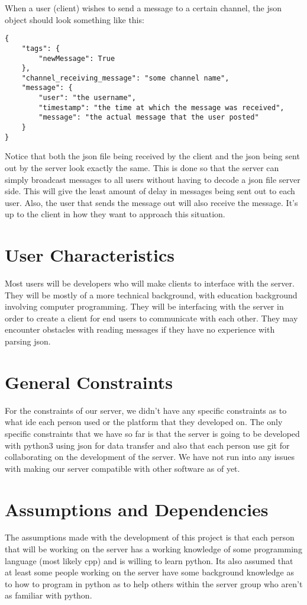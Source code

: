 When a user (client) wishes to send a message to a certain channel, the \gls{json} object should look something like this:

\begin{lstlisting}[style=json]
{
    "tags": {
        "newMessage": True
    },
    "channel_receiving_message": "some channel name",
    "message": {
        "user": "the username",
        "timestamp": "the time at which the message was received",
        "message": "the actual message that the user posted"
    }
}
\end{lstlisting}

Notice that both the \gls{json} file being received by the client and the \gls{json} being sent out by the server look exactly the same. This is done so that the server can simply broadcast messages to all users without having to decode a \gls{json} file server side. This will give the least amount of delay in messages being sent out to each user. Also, the user that sends the message out will also receive the message. It's up to the client in how they want to approach this situation.


\section{User Characteristics}\label{user-characteristics}
Most users will be developers who will make clients to interface with the server. They will be mostly of a more technical background, with education background involving computer programming. They will be interfacing with the server in order to create a client for end users to communicate with each other. They may encounter obstacles with reading messages if they have no experience with parsing \gls{json}.

\section{General Constraints}\label{general-constraints}
For the constraints of our server, we didn't have any specific constraints as to what \acrfull{ide} each person used or the platform that they developed on. The only specific constraints that we have so far is that the server is going to be developed with \gls{python}3 using \gls{json} for data transfer and also that each person use \gls{git} for collaborating on the development of the server. We have not run into any issues with making our server compatible with other software as of yet.

\section{Assumptions and
Dependencies}\label{assumptions-and-dependencies}
The assumptions made with the development of this project is that each person that will be working on the server has a working knowledge of some programming language (most likely \gls{cpp}) and is willing to learn python. Its also assumed that at least some people working on the server have some background knowledge as to how to program in python as to help others within the server group who aren't as familiar with \gls{python}.

